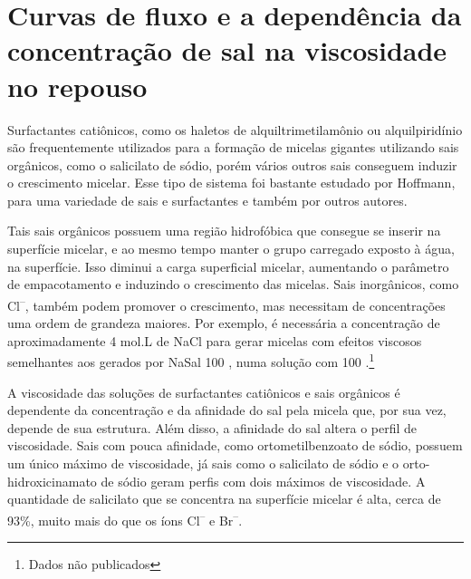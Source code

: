 		\section{Curvas de fluxo e a dependência da concentração de sal na viscosidade no repouso}    
			
		Surfactantes catiônicos, como os haletos de alquiltrimetilamônio ou alquilpiridínio são frequentemente utilizados para a formação de micelas gigantes utilizando sais orgânicos, como o salicilato de sódio, porém vários outros sais conseguem induzir o crescimento micelar. Esse tipo de sistema foi bastante estudado por Hoffmann, para uma variedade de sais e surfactantes\cite{Rehage1991, Rehage1988, Hoffmann1992a} e também por outros autores.\cite{Wei2013, Hartmann1998, Lutz-Bueno2016a,Lutz-Bueno2017, Cappelaere1998, Pleines2019, Clinckspoor2015, Raghavan2002a, Davies2006}
		
		Tais sais orgânicos possuem uma região hidrofóbica que consegue se inserir na superfície micelar, e ao mesmo tempo manter o grupo carregado exposto à água, na superfície. Isso diminui a carga superficial micelar, aumentando o parâmetro de empacotamento e induzindo o crescimento das micelas. Sais inorgânicos, como Cl\textsuperscript{--}, também podem promover o crescimento, mas necessitam de concentrações uma ordem de grandeza maiores. Por exemplo, é necessária a concentração de aproximadamente 4 mol.L\menosUm{} de NaCl para gerar micelas com efeitos viscosos semelhantes aos gerados por NaSal 100 \mM, numa solução com \CTAB{} 100{} \mM.\footnote{Dados não publicados}
		
		
		
		A viscosidade das soluções de surfactantes catiônicos e sais orgânicos é dependente da concentração e da afinidade do sal pela micela que, por sua vez, depende de sua estrutura. Além disso, a afinidade do sal altera o perfil de viscosidade. Sais com pouca afinidade, como ortometilbenzoato de sódio, possuem um único máximo de viscosidade, já sais como o salicilato de sódio e o orto-hidroxicinamato de sódio geram perfis com dois máximos de viscosidade.\cite{Clinckspoor2015, Ito2014c}
		A quantidade de salicilato que se concentra na superfície micelar é alta, cerca de 93\%, muito mais do que os íons Cl\textsuperscript{--} e Br\textsuperscript{--}.\cite{Rehage1991}
		
